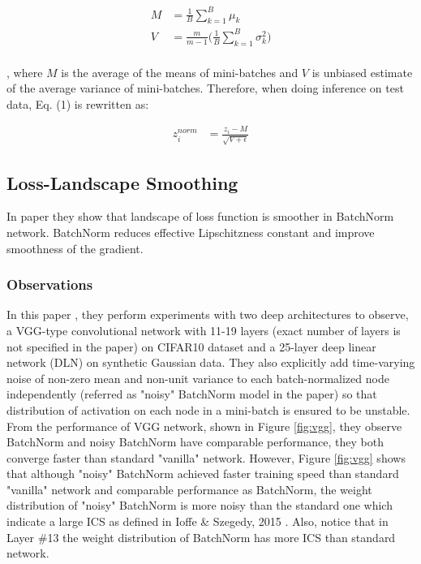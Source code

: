 \documentclass{article}
\begin{document}
\begin{align*}
   M &= \frac{1}{B}\sum_{k=1}^B\mu_k\\
   V &= \frac{m}{m-1}\Bigg(\frac{1}{B}\sum_{k=1}^B\sigma^2_k\Bigg)\\
\end{align*}

, where $M$ is the average of the means of mini-batches and $V$ is unbiased estimate of the average variance of mini-batches. Therefore, when doing inference on test data, Eq. (1) is rewritten as:

\begin{align*}
    z_i^{norm}& = \frac{z_i-M}{\sqrt{V+\epsilon}}
\end{align*}


\subsection{Loss-Landscape Smoothing} \label{landsmooth}
In paper \cite{landscape} they show that landscape of loss function is smoother in BatchNorm network. BatchNorm reduces effective Lipschitzness constant and improve smoothness of the gradient.

\subsubsection{Observations}

In this paper \cite{landscape}, they perform experiments with two deep architectures to observe, a VGG-type convolutional network with 11-19 layers (exact number of layers is not specified in the paper) on CIFAR10 dataset and a 25-layer deep linear network (DLN) on synthetic Gaussian data. They also explicitly add time-varying noise of non-zero mean and non-unit variance to each batch-normalized node independently (referred as "noisy" BatchNorm model in the paper) so that distribution of activation on each node in a mini-batch is ensured to be unstable. From the performance of VGG network, shown in Figure \ref{fig:vgg}, they observe BatchNorm and noisy BatchNorm have comparable performance, they both converge faster than standard "vanilla" network. However, Figure \ref{fig:vgg} shows that although "noisy" BatchNorm achieved faster training speed than standard "vanilla" network and comparable performance as BatchNorm, the weight distribution of "noisy" BatchNorm  is more noisy than the standard one which indicate a large ICS as defined in Ioffe \& Szegedy, 2015 \cite{batchnorm}. Also, notice that in Layer \#13 the weight distribution of BatchNorm has more ICS than standard network.
\end{document}
